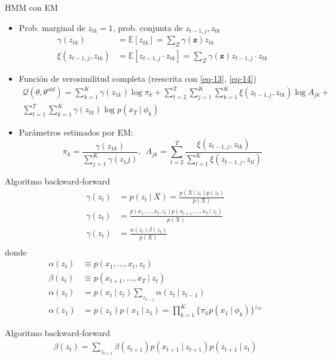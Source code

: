 \begin{frame}{HMM con EM}
  \begin{itemize}
      \item Prob. marginal de $z_{tk} = 1$, prob. conjunta de $z_{t-1,j}, z_{tk}$
        \begin{align}
          \gamma(z_{tk}) &= \mathbb{E} \left[ z_{tk} \right] = \sum_Z  \gamma(\mathbf{z}) z_{tk} \label{eq-13} \\
          \xi(z_{t-1,j}, z_{tk}) &= \mathbb{E} \left[z_{t-1, j} \cdot z_{tk} \right] = 
            \sum_Z  \gamma(\mathbf{z}) z_{t-1, j} \cdot z_{tk} \label{eq-14}
        \end{align}  
        
        \item Función de verosimilitud completa (reescrita con \eqref{eq-13}, \eqref{eq-14})
          \begin{equation}
            \begin{split}
              \mathcal{Q}(\theta, \theta^{old}) = 
              \sum_{k=1}^K \gamma(z_{1k}) \log \pi_k + 
              \sum_{t=2}^T \sum_{j=1}^K \sum_{k=1}^K \xi(z_{t-1,j}, z_{tk}) \log A_{jk} + \\
              \sum_{t=1}^T \sum_{k=1}^K \gamma(z_{tk}) \log p(x_T ~|~ \phi_k)
            \end{split}
          \end{equation}
          
         \item Parámetros estimados por EM: 
         \begin{equation}
           \pi_k = \frac{\gamma(z_{1k})}{\sum_{j=1}^K \gamma(z_1j)}, ~~
           A_{jk} = \sum_{t=2}^T \frac{\xi(z_{t-1,j}, z_{tk})}{ \sum_{l=1}^K \xi(z_{t-1,j}, z_{tl})}
         \end{equation}
  \end{itemize}
\end{frame}

\begin{frame}{Algoritmo backward-forward}
  \begin{align}
  \gamma(z_t) &= p(z_t ~|~ X) = \frac{p(X ~|~ z_t) p(z_t)}{p(X)} \\
  \gamma(z_t) &= \frac{p(x_1, ..., x_t, z_t)p(x_{t+1}, ..., x_T ~|~ z_t)}{p(X)} \\
  \gamma(z_t) &= \frac{\alpha(z_t) \beta(z_t)}{p(X)} \\  
  \end{align}
  donde 
  \begin{align}
    \alpha(z_t) &\equiv p(x_1, ..., x_t, z_t) \\
    \beta(z_t) &\equiv p(x_{t+1}, ..., x_T ~|~ z_t)  \\
    \alpha(z_t) &= p(x_t ~|~ z_t) \sum_{z_{t-1}} \alpha(z_t ~|~ z_{t-1}) \\
    \alpha(z_1) &= p(z_1) p(x_1 ~|~ z_1) = \prod_{k=1}^K \lbrace {\pi_k p(x_1 ~|~ \phi_k)} \rbrace ^ {z_{1k}}
  \end{align}  
\end{frame}

\begin{frame}{Algoritmo backward-forward}
  \begin{align}
    \beta(z_t) = \sum_{z_{t+1}} \beta(z_{t+1})p(x_{t+1} ~|~ z_{t+1}) p(z_{t+1} ~|~ z_t)
  \end{align}  
\end{frame}